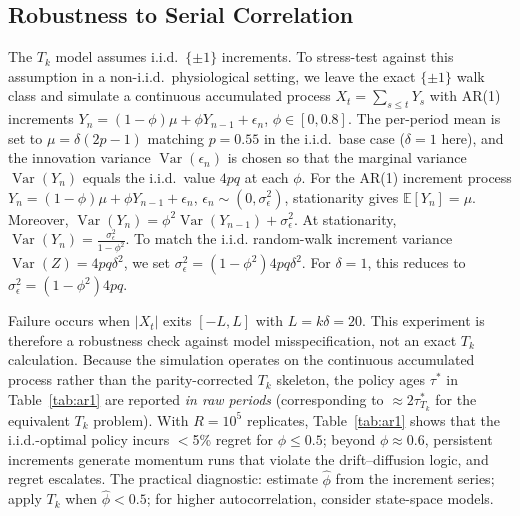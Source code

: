 \documentclass[pdflatex,sn-mathphys-num]{sn-jnl}
\theoremstyle{definition}
\DeclareMathOperator{\Var}{Var}
\newcommand{\E}{\mathbb{E}}
\numberwithin{equation}{section}
\begin{document}
\subsection{Robustness to Serial Correlation}

The $T_k$ model assumes i.i.d.\ $\{\pm 1\}$ increments. To stress-test against this assumption in a non-i.i.d.\ physiological setting, we leave the exact $\{\pm 1\}$ walk class and simulate a continuous accumulated process $X_t=\sum_{s\le t}Y_s$ with AR(1) increments $Y_n = (1{-}\phi)\mu + \phi Y_{n-1}+\epsilon_n$, $\phi\in[0,0.8]$. The per-period mean is set to $\mu=\delta(2p-1)$ matching $p{=}0.55$ in the i.i.d.\ base case ($\delta{=}1$ here), and the innovation variance $\Var(\epsilon_n)$ is chosen so that the marginal variance $\Var(Y_n)$ equals the i.i.d.\ value $4pq$ at each $\phi$.
For the AR(1) increment process
$\displaystyle Y_n=(1-\phi)\mu+\phi Y_{n-1}+\epsilon_n$, $\epsilon_n\sim(0,\sigma_\epsilon^2)$,
stationarity gives
$\E[Y_n]=\mu$.
Moreover,
$\displaystyle \Var(Y_n)
=
\phi^2\Var(Y_{n-1})+\sigma_\epsilon^2$.
At stationarity,
$\displaystyle \Var(Y_n)=\frac{\sigma_\epsilon^2}{1-\phi^2}$.
To match the i.i.d. random-walk increment variance
$\displaystyle \Var(Z)=4pq\delta^2$,
we set
$\displaystyle \sigma_\epsilon^2
=
(1-\phi^2)4pq\delta^2$.
For \(\delta=1\), this reduces to
$\displaystyle \sigma_\epsilon^2=(1-\phi^2)4pq$.

Failure occurs when $|X_t|$ exits $[-L,L]$ with $L=k\delta=20$. This experiment is therefore a robustness check against model misspecification, not an exact $T_k$ calculation. Because the simulation operates on the continuous accumulated process rather than the parity-corrected $T_k$ skeleton, the policy ages $\tau^*$ in Table~\ref{tab:ar1} are reported \emph{in raw periods} (corresponding to $\approx 2\tau^*_{T_k}$ for the equivalent $T_k$ problem). With $R{=}10^5$ replicates, Table~\ref{tab:ar1} shows that the i.i.d.-optimal policy incurs $<$5\% regret for $\phi\le 0.5$; beyond $\phi\approx 0.6$, persistent increments generate momentum runs that violate the drift--diffusion logic, and regret escalates. The practical diagnostic: estimate $\hat\phi$ from the increment series; apply $T_k$ when $\hat\phi<0.5$; for higher autocorrelation, consider state-space models.
\end{document}
